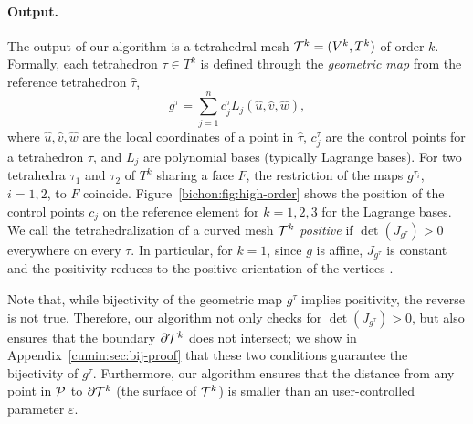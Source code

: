 \paragraph{Output.}
The output of our algorithm is a tetrahedral mesh $\T^k = (V^k,T^k)$ of order $k$. 
Formally, each tetrahedron $\tau\in T^k$ is defined through the \emph{geometric map} from the reference tetrahedron $\hat \tau$,
\begin{equation}\label{eq:gmap}
g^\tau = \sum_{j=1}^n c_j^\tau L_j(\hat u,\hat v,\hat w),
\end{equation}
where $\hat u,\hat v,\hat w$ are the local coordinates of a point in $\hat \tau$, $c_j^\tau$ are the control points for a tetrahedron $\tau$, and $L_j$ are polynomial bases (typically Lagrange bases).
For two tetrahedra $\tau_1$ and $\tau_2$ 
of $T^k$ sharing a face $F$, the restriction of the maps $g^{\tau_i}$, $i=1,2$, to $F$ coincide.
Figure~\ref{bichon:fig:high-order} shows the position of the control points $c_j$ on the reference element for $k=1,2,3$ for the Lagrange bases. We call the tetrahedralization of a curved mesh $\T^k$ \emph{positive} if $\det(J_{g^\tau}) > 0$ everywhere on every $\tau$. 
In particular, for $k=1$, since $g$ is affine, $J_{g^\tau}$ is constant and the positivity reduces to the positive orientation of the vertices \cite{shewchuk1997adaptive}.

Note that, while bijectivity of the geometric map $g^\tau$ implies positivity, the reverse is not true. 
Therefore, our algorithm not only checks for $\det(J_{g^\tau}) > 0$, but also ensures that the boundary $\partial\T^k$ does not intersect; we show in Appendix~\ref{cumin:sec:bij-proof} that these two conditions guarantee the bijectivity of $g^\tau$.
Furthermore, our algorithm ensures that the distance from any point in $\P$ to $\partial\T^k$ (the surface of $\T^k$) is smaller than an user-controlled parameter $\varepsilon$.

